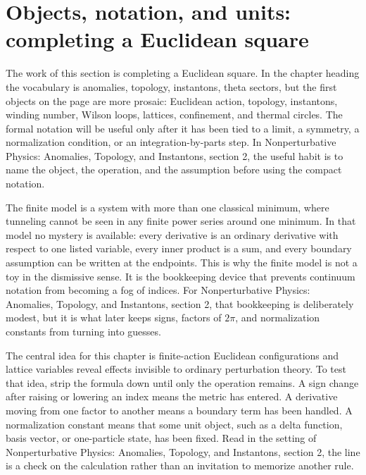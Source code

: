 \section{Objects, notation, and units: completing a Euclidean square}













The work of this section is completing a Euclidean square.  In the chapter heading the vocabulary is anomalies, topology, instantons, theta sectors, but the first objects on the page are more prosaic: Euclidean action, topology, instantons, winding number, Wilson loops, lattices, confinement, and thermal circles.  The formal notation will be useful only after it has been tied to a limit, a symmetry, a normalization condition, or an integration-by-parts step.  In Nonperturbative Physics: Anomalies, Topology, and Instantons, section 2, the useful habit is to name the object, the operation, and the assumption before using the compact notation.

The finite model is a system with more than one classical minimum, where tunneling cannot be seen in any finite power series around one minimum.  In that model no mystery is available: every derivative is an ordinary derivative with respect to one listed variable, every inner product is a sum, and every boundary assumption can be written at the endpoints.  This is why the finite model is not a toy in the dismissive sense.  It is the bookkeeping device that prevents continuum notation from becoming a fog of indices.  For Nonperturbative Physics: Anomalies, Topology, and Instantons, section 2, that bookkeeping is deliberately modest, but it is what later keeps signs, factors of \(2\pi\), and normalization constants from turning into guesses.

The central idea for this chapter is finite-action Euclidean configurations and lattice variables reveal effects invisible to ordinary perturbation theory.  To test that idea, strip the formula down until only the operation remains.  A sign change after raising or lowering an index means the metric has entered.  A derivative moving from one factor to another means a boundary term has been handled.  A normalization constant means that some unit object, such as a delta function, basis vector, or one-particle state, has been fixed.  Read in the setting of Nonperturbative Physics: Anomalies, Topology, and Instantons, section 2, the line is a check on the calculation rather than an invitation to memorize another rule.

